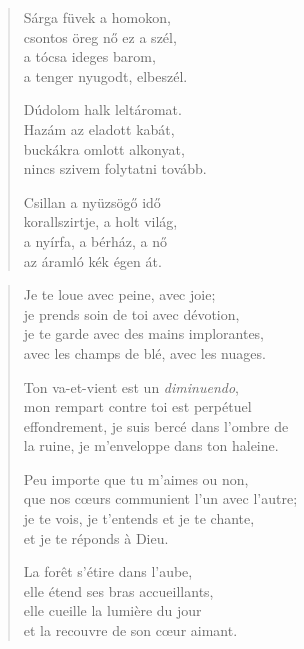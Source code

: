 \documentclass[11pt]{book}
\newcommand*{\centeredornament}{\centerline{\pgfornament[width=6cm]{88}}}
\begin{document}
\newpage

\vspace*{-15mm}
\centeredornament



\begin{verse}
  Sárga füvek a homokon, \\
  csontos öreg nő ez a szél, \\
  a tócsa ideges barom, \\
  a tenger nyugodt, elbeszél.

  Dúdolom halk leltáromat. \\
  Hazám az eladott kabát, \\
  buckákra omlott alkonyat, \\
  nincs szivem folytatni tovább.

  Csillan a nyüzsögő idő \\
  korallszirtje, a holt világ, \\
  a nyírfa, a bérház, a nő \\
  az áramló kék égen át.
\end{verse}

\newpage

\vspace*{-15mm}
\centeredornament



\begin{verse}
  Je te loue avec peine, avec joie; \\
  je prends soin de toi avec dévotion, \\
  je te garde avec des mains implorantes, \\
  avec les champs de blé, avec les nuages.

  Ton va-et-vient est un \emph{diminuendo}, \\
  mon rempart contre toi est perpétuel \\
  effondrement, je suis bercé dans l'ombre de \\
  la ruine, je m'enveloppe dans ton haleine.

  Peu importe que tu m'aimes ou non, \\
  que nos cœurs communient l'un avec l'autre;\hspace*{-1mm} \\
  je te vois, je t'entends et je te chante, \\
  et je te réponds à Dieu.

  La forêt s'étire dans l'aube, \\
  elle étend ses bras accueillants, \\
  elle cueille la lumière du jour \\
  et la recouvre de son cœur aimant.
\end{verse}
\end{document}
